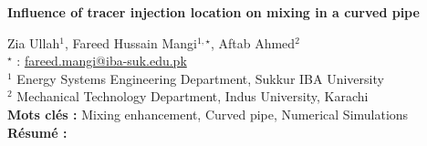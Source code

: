 


    \newpage

\BgThispage

%
\begin{flushleft}
\addtocounter{section}{1}
{\Large \textbf{Influence of tracer injection location on mixing in a curved pipe}}\label{ref:13}
\end{flushleft}
%
Zia Ullah$^{1}$, Fareed Hussain Mangi$^{1,\star}$, Aftab Ahmed$^{2}$\\[2mm]
$^{\star}$ \Letter : \url{fareed.mangi@iba-suk.edu.pk}\\[2mm]
{\footnotesize $^{1}$ Energy Systems Engineering Department, Sukkur IBA University}\\
{\footnotesize $^{2}$ Mechanical Technology Department, Indus University, Karachi}\\
[4mm]
%
\noindent \textbf{Mots clés : } Mixing enhancement, Curved pipe, Numerical Simulations\\[4mm]
%
\noindent \textbf{Résumé : } 

